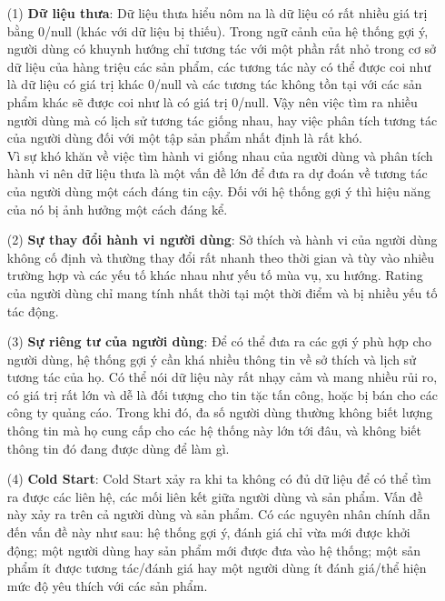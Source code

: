\begin{itemize}
    \item[(1)] \textbf{Dữ liệu thưa}: Dữ liệu thưa hiểu nôm na là dữ liệu có rất nhiều giá trị bằng 0/null (khác với dữ liệu bị thiếu). Trong ngữ cảnh của hệ thống gợi ý, người dùng có khuynh hướng chỉ tương tác với một phần rất nhỏ trong cơ sở dữ liệu của hàng triệu các sản phẩm, các tương tác này có thể được coi như là dữ liệu có giá trị khác 0/null và các tương tác không tồn tại với các sản phẩm khác sẽ được coi như là có giá trị 0/null. Vậy nên việc tìm ra nhiều người dùng mà có lịch sử tương tác giống nhau, hay việc phân tích tương tác của người dùng đối với một tập sản phẩm nhất định là rất khó.\\
    Vì sự khó khăn về việc tìm hành vi giống nhau của người dùng và phân tích hành vi nên dữ liệu thưa là một vấn đề lớn để đưa ra dự đoán về tương tác của người dùng một cách đáng tin cậy. Đối với hệ thống gợi ý thì hiệu năng của nó bị ảnh hưởng một cách đáng kể.
    
    \item[(2)] \textbf{Sự thay đổi hành vi người dùng}: Sở thích và hành vi của người dùng không cố định và thường thay đổi rất nhanh theo thời gian và tùy vào nhiều trường hợp và các yếu tố khác nhau như yếu tố mùa vụ, xu hướng. Rating của người dùng chỉ mang tính nhất thời tại một thời điểm và bị nhiều yếu tố tác động.
    
    \item[(3)] \textbf{Sự riêng tư của người dùng}: Để có thể đưa ra các gợi ý phù hợp cho người dùng, hệ thống gợi ý cần khá nhiều thông tin về sở thích và lịch sử tương tác của họ. Có thể nói dữ liệu này rất nhạy cảm và mang nhiều rủi ro, có giá trị rất lớn và dễ là đối tượng cho tin tặc tấn công, hoặc bị bán cho các công ty quảng cáo. Trong khi đó, đa số người dùng thường không biết lượng thông tin mà họ cung cấp cho các hệ thống này lớn tới đâu, và không biết thông tin đó đang được dùng để làm gì.
    
    \item[(4)] \textbf{Cold Start}: Cold Start xảy ra khi ta không có đủ dữ liệu để có thể tìm ra được các liên hệ, các mối liên kết giữa người dùng và sản phẩm. Vấn đề này xảy ra trên cả người dùng và sản phẩm. Có các nguyên nhân chính dẫn đến vấn đề này như sau: hệ thống gợi ý, đánh giá chỉ vừa mới được khởi động; một người dùng hay sản phẩm mới được đưa vào hệ thống; một sản phẩm ít được tương tác/đánh giá hay một người dùng ít đánh giá/thể hiện mức độ yêu thích với các sản phẩm.
\end{itemize}


